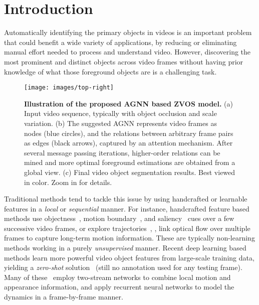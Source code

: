 \documentclass[10pt,twocolumn,letterpaper]{article}
\begin{document}
\vspace{-6pt}
\section{Introduction}
	\vspace*{-4pt}	



Automatically identifying the primary objects in videos is an important problem that could benefit
a wide variety of  applications, by
reducing or eliminating manual effort needed to process and understand video.
However, 
discovering the most prominent and distinct
objects across video frames without having prior knowledge of what those
foreground objects are is a challenging task.
\begin{figure}[t]
\centering
      \texttt{[image: images/top-right]}
\vspace{-18pt}
\caption{\textbf{\small Illustration of the proposed AGNN based ZVOS model.} \small (a) Input video sequence, typically with object occlusion and scale variation. (b) The suggested AGNN represents video frames as nodes (blue circles), and the relations between arbitrary frame pairs as edges (black arrows), captured by an attention mechanism. After several message passing iterations, higher-order relations can be mined and more optimal foreground estimations are obtained from a global view. (c) Final video object segmentation results. Best viewed in color. Zoom in for details. }
\label{fig:topright}
\vspace{-15pt}
\end{figure}
Traditional methods tend to tackle this issue by using handcrafted or learnable features in a \textit{local} or \textit{sequential} manner. For instance, handcrafted feature based methods use objectness~\cite{zhang2013}, motion boundary~\cite{DBLP:conf/iccv/PapazoglouF13}, and saliency~\cite{DBLP:conf/cvpr/WangSP15} cues over a few successive video frames, or explore trajectories~\cite{DBLP:conf/iccv/OchsB11}, \ie, link optical flow over multiple frames to capture long-term motion information. These are typically non-learning methods working in a purely \textit{unsupervised} manner. Recent deep learning based methods learn more powerful video object features from large-scale training data, yielding a \textit{zero-shot} solution~\cite{ventura2019rvos}  (still no annotation used for any testing frame). Many of these~\cite{cheng2017segflow,DBLP:conf/cvpr/TokmakovAS17,jain2017fusionseg,DBLP:conf/iccv/TokmakovAS17,Li_2018_ECCV1, Song_2018_ECCV} employ two-stream networks to combine local motion and appearance information, and apply recurrent neural networks to model the dynamics in a frame-by-frame manner.
\end{document}
